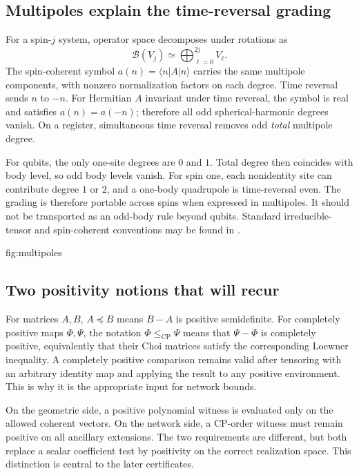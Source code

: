 \subsection{Multipoles explain the time-reversal grading}

For a spin-$j$ system, operator space decomposes under rotations as
\[
\mathcal B(V_j)\simeq\bigoplus_{\ell=0}^{2j}V_\ell.
\]
The spin-coherent symbol $a(n)=\langle n|A|n\rangle$ carries the same
multipole components, with nonzero normalization factors on each degree.
Time reversal sends $n$ to $-n$. For Hermitian $A$ invariant under time
reversal, the symbol is real and satisfies $a(n)=a(-n)$; therefore all odd
spherical-harmonic degrees vanish. On a register, simultaneous time reversal
removes odd \emph{total} multipole degree.

For qubits, the only one-site degrees are $0$ and $1$. Total degree then
coincides with body level, so odd body levels vanish. For spin one, each
nonidentity site can contribute degree $1$ or $2$, and a one-body
quadrupole is time-reversal even. The grading is therefore portable across
spins when expressed in multipoles. It should not be transported as an
odd-body rule beyond qubits. Standard irreducible-tensor and spin-coherent
conventions may be found in \citet{Radcliffe1971}.

{fig:multipoles}

\subsection{Two positivity notions that will recur}

For matrices $A,B$, $A\preceq B$ means $B-A$ is positive semidefinite.
For completely positive maps $\Phi,\Psi$, the notation
$\Phi\le_{\mathrm{CP}}\Psi$ means that $\Psi-\Phi$ is completely positive,
equivalently that their Choi matrices satisfy the corresponding Loewner
inequality. A completely positive comparison remains valid after tensoring
with an arbitrary identity map and applying the result to any positive
environment. This is why it is the appropriate input for network bounds.

On the geometric side, a positive polynomial witness is evaluated only on
the allowed coherent vectors. On the network side, a CP-order witness must
remain positive on all ancillary extensions. The two requirements are
different, but both replace a scalar coefficient test by positivity on the
correct realization space. This distinction is central to the later
certificates.
